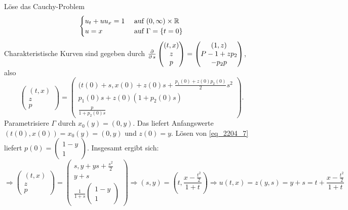 \begin{bsp} \label{bsp_9}
	Löse das Cauchy-Problem \marginnote{[9]}
	\[ \begin{cases}
		u_t + uu_x = 1 & \text{ auf } (0,\infty) \times \mathbb{R} \\
		u = x & \text{ auf } \Gamma = \{t = 0\} \end{cases} \]
	Charakteristische Kurven sind gegeben durch $\frac{\operatorname{\partial}}{\operatorname{\partial} s} \begin{pmatrix} (t,x) \\ z \\ 	p \end{pmatrix} = \begin{pmatrix} (1,z) \\ P-1+zp_2 \\ -p_2 p \end{pmatrix}$, also
	\[ \begin{pmatrix} (t,x) \\ z \\ 	p \end{pmatrix} = \begin{pmatrix} (t(0)+s,x(0) + z(0)s + \frac{p_1(0)+z(0)p_2(0)}{2} s^2 \\ p_1(0)s + z(0)(1+p_2(0)s) \\ \frac{p}{1+p_2(0)s} \end{pmatrix}.\]
	Parametrisiere $\Gamma$ durch $x_0(y) = (0,y)$. Das liefert Anfangswerte $(t(0),x(0))=x_0(y)=(0,y)$ und $z(0) = y$. Lösen von \eqref{eq_2204_7} liefert $p(0) = \begin{pmatrix} 1-y \\ 1 \end{pmatrix}$. Insgesamt ergibt sich:
	\[ \Rightarrow \begin{pmatrix} (t,x) \\ z \\ p \end{pmatrix} = \begin{pmatrix} s,y+ys+\frac{s^2}{2} \\ y+s \\ \frac{1}{1+s} \begin{pmatrix} 1-y \\ 1 \end{pmatrix} \end{pmatrix} \Rightarrow (s,y) = \left( t,\frac{x-\frac{t^2}{2}}{1+t}\right) \Rightarrow u(t,x) = z(y,s) = y+s = t + \frac{x-\frac{t^2}{2}}{1+t} \]
\end{bsp}
	
